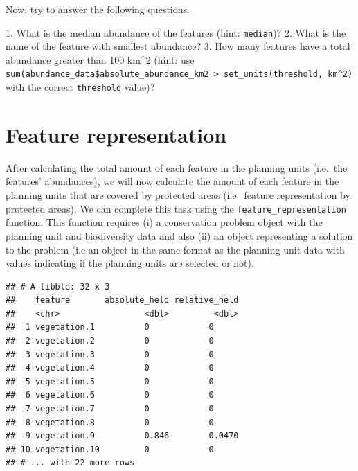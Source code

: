\documentclass[12pt,]{book}
\makeatletter
\newenvironment{Shaded}{\begin{snugshade}}{\end{snugshade}}
\newcommand{\KeywordTok}[1]{\textcolor[rgb]{0.13,0.29,0.53}{\textbf{#1}}}
\newcommand{\StringTok}[1]{\textcolor[rgb]{0.31,0.60,0.02}{#1}}
\newcommand{\CommentTok}[1]{\textcolor[rgb]{0.56,0.35,0.01}{\textit{#1}}}
\newcommand{\OperatorTok}[1]{\textcolor[rgb]{0.81,0.36,0.00}{\textbf{#1}}}
\newcommand{\NormalTok}[1]{#1}
\newenvironment{kframe}{%
\medskip{}
\setlength{\fboxsep}{.8em}
 \def\at@end@of@kframe{}%
 \ifinner\ifhmode%
  \def\at@end@of@kframe{\end{minipage}}%
  \begin{minipage}{\columnwidth}%
 \fi\fi%
 \def\FrameCommand##1{\hskip\@totalleftmargin \hskip-\fboxsep
 \colorbox{shadecolor}{##1}\hskip-\fboxsep
     \hskip-\linewidth \hskip-\@totalleftmargin \hskip\columnwidth}%
 \MakeFramed {\advance\hsize-\width
   \@totalleftmargin\z@ \linewidth\hsize
   \@setminipage}}%
 {\par\unskip\endMakeFramed%
 \at@end@of@kframe}
\newenvironment{rmdblock}[1]
  {
  \begin{itemize}
  \renewcommand{\labelitemi}{
    \raisebox{-.7\height}[0pt][0pt]{
      {\setkeys{Gin}{width=3em,keepaspectratio}\texttt{[image: images/\#1]}}
    }
  }
  \setlength{\fboxsep}{1em}
  \begin{kframe}
  \item
  }
  {
  \end{kframe}
  \end{itemize}
  }
\newenvironment{rmdquestion}
  {\begin{rmdblock}{question}}
  {\end{rmdblock}}
\makeatother
\begin{document}
Now, try to answer the following questions.

\begin{rmdquestion} 1. What is the median abundance of the
features (hint: \texttt{median})? 2. What is the name of the feature
with smallest abundance? 3. How many features have a total abundance
greater than 100 km\^{}2 (hint: use
\texttt{sum(abundance\_data\$absolute\_abundance\_km2\ \textgreater{}\ set\_units(threshold,\ km\^{}2)}
with the correct \texttt{threshold} value)?
\end{rmdquestion}

\section{Feature representation}\label{feature-representation}

After calculating the total amount of each feature in the planning units
(i.e.~the features' abundances), we will now calculate the amount of
each feature in the planning units that are covered by protected areas
(i.e.~feature representation by protected areas). We can complete this
task using the \texttt{feature\_representation} function. This function
requires (i) a conservation problem object with the planning unit and
biodiversity data and also (ii) an object representing a solution to the
problem (i.e an object in the same format as the planning unit data with
values indicating if the planning units are selected or not).

\begin{Shaded}
\end{Shaded}

\begin{verbatim}
## # A tibble: 32 x 3
##    feature       absolute_held relative_held
##    <chr>                 <dbl>         <dbl>
##  1 vegetation.1          0            0     
##  2 vegetation.2          0            0     
##  3 vegetation.3          0            0     
##  4 vegetation.4          0            0     
##  5 vegetation.5          0            0     
##  6 vegetation.6          0            0     
##  7 vegetation.7          0            0     
##  8 vegetation.8          0            0     
##  9 vegetation.9          0.846        0.0470
## 10 vegetation.10         0            0     
## # ... with 22 more rows
\end{verbatim}
\end{document}
